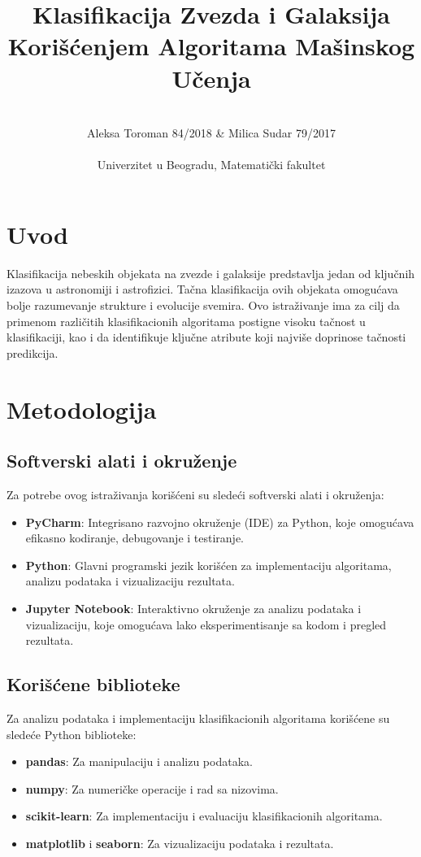 \documentclass[a4paper,12pt]{article}
\title{Klasifikacija Zvezda i Galaksija Korišćenjem Algoritama Mašinskog Učenja}
\author{\\Aleksa Toroman 84/2018 & Milica Sudar 79/2017 \\\\ Univerzitet u Beogradu, Matematički fakultet}
\begin{document}
\maketitle

\newpage
\renewcommand{\contentsname}{Sadržaj}
\tableofcontents

\newpage

\section{Uvod}
Klasifikacija nebeskih objekata na zvezde i galaksije predstavlja jedan od ključnih izazova u astronomiji i astrofizici. Tačna klasifikacija ovih objekata omogućava bolje razumevanje strukture i evolucije svemira. Ovo istraživanje ima za cilj da primenom različitih klasifikacionih algoritama postigne visoku tačnost u klasifikaciji, kao i da identifikuje ključne atribute koji najviše doprinose tačnosti predikcija.


\section{Metodologija}
\subsection{Softverski alati i okruženje}
Za potrebe ovog istraživanja korišćeni su sledeći softverski alati i okruženja:
\begin{itemize}
    \item \textbf{PyCharm}: Integrisano razvojno okruženje (IDE) za Python, koje omogućava efikasno kodiranje, debugovanje i testiranje.
    \item \textbf{Python}: Glavni programski jezik korišćen za implementaciju algoritama, analizu podataka i vizualizaciju rezultata.
    \item \textbf{Jupyter Notebook}: Interaktivno okruženje za analizu podataka i vizualizaciju, koje omogućava lako eksperimentisanje sa kodom i pregled rezultata.
\end{itemize}

\subsection{Korišćene biblioteke}
Za analizu podataka i implementaciju klasifikacionih algoritama korišćene su sledeće Python biblioteke:
\begin{itemize}
    \item \textbf{pandas}: Za manipulaciju i analizu podataka.
    \item \textbf{numpy}: Za numeričke operacije i rad sa nizovima.
    \item \textbf{scikit-learn}: Za implementaciju i evaluaciju klasifikacionih algoritama.
    \item \textbf{matplotlib} i \textbf{seaborn}: Za vizualizaciju podataka i rezultata.
\end{itemize}
\end{document}

